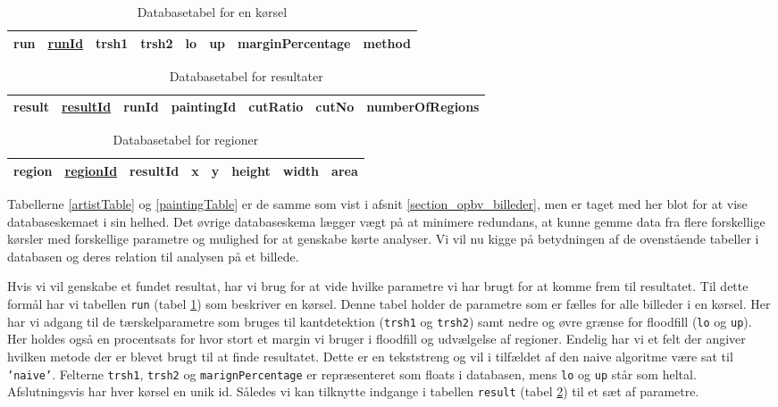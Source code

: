 {\begin{table}[!h]
    \centering
    \begin{tabular}{|l||c|c|c|c|c|c|c|}
        \hline
        \bf{run} \hspace{0.5cm} & \underline{runId} & trsh1 & trsh2 & lo & up & marginPercentage & method \\\hline
    \end{tabular}
    \caption{Databasetabel for en kørsel}
    \label{runTable}
\end{table}

\begin{table}[!h]
    \centering
    \begin{tabular}{|l||c|c|c|c|c|c|}
        \hline
        \bf{result} \hspace{0.5cm} & \underline{resultId} & runId & paintingId & cutRatio & cutNo & numberOfRegions \\\hline
    \end{tabular}
    \caption{Databasetabel for resultater}
    \label{resultTable}
\end{table}

\begin{table}[!h]
    \centering
    \begin{tabular}{|l||c|c|c|c|c|c|c|}
        \hline
        \bf{region} \hspace{0.5cm} & \underline{regionId} & resultId & x & y & height & width & area \\\hline
    \end{tabular}
    \caption{Databasetabel for regioner}
    \label{regionTable}
\end{table}

Tabellerne \ref{artistTable} og \ref{paintingTable} er de samme som vist
i afsnit \ref{section_opbv_billeder}, men er taget med her blot for at
vise databaseskemaet i sin helhed. Det øvrige databaseskema lægger vægt
på at minimere redundans, at kunne gemme data fra flere forskellige
kørsler med forskellige parametre og mulighed for at genskabe kørte
analyser. Vi vil nu kigge på betydningen af de ovenstående tabeller i
databasen og deres relation til analysen på et billede.

Hvis vi vil genskabe et fundet resultat, har vi brug for at vide hvilke
parametre vi har brugt for at komme frem til resultatet. Til dette
formål har vi tabellen \texttt{run} (tabel \ref{runTable}) som beskriver
en kørsel. Denne tabel holder de parametre som er fælles for alle
billeder i en kørsel. Her har vi adgang til de tærskelparametre som
bruges til kantdetektion (\texttt{trsh1} og \texttt{trsh2}) samt nedre
og øvre grænse for floodfill (\texttt{lo} og \texttt{up}). Her holdes
også en procentsats for hvor stort et margin vi bruger i floodfill og
udvælgelse af regioner. Endelig har vi et felt der angiver hvilken
metode der er blevet brugt til at finde resultatet. Dette er en
tekststreng og vil i tilfældet af den naive algoritme være sat til
\texttt{'naive'}. Felterne \texttt{trsh1}, \texttt{trsh2} og
\texttt{marignPercentage} er repræsenteret som floats i databasen,
mens \texttt{lo} og \texttt{up} står som heltal. Afslutningsvis har
hver kørsel en unik id. Således vi kan tilknytte indgange i tabellen
\texttt{result} (tabel \ref{resultTable}) til et sæt af parametre.

}
